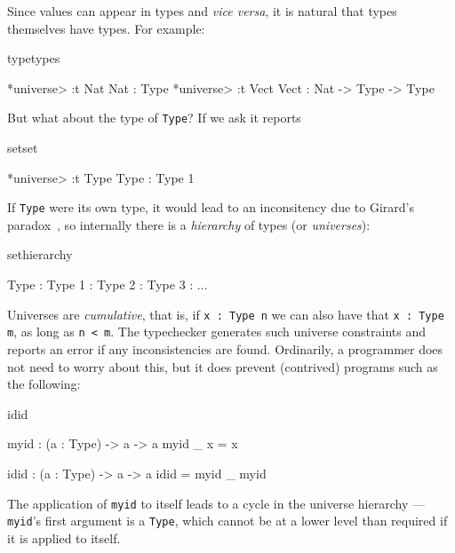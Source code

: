 Since values can appear in types and \emph{vice versa}, it is natural that types themselves
have types. For example:

\begin{SaveVerbatim}{typetypes}

*universe> :t Nat
Nat : Type
*universe> :t Vect
Vect : Nat -> Type -> Type

\end{SaveVerbatim}

\noindent
But what about the type of \texttt{Type}? If we ask \Idris{} it reports

\begin{SaveVerbatim}{setset}

*universe> :t Type
Type : Type 1

\end{SaveVerbatim}

\noindent
If \texttt{Type} were its own type, it would lead to an inconsitency
due to Girard's paradox~\cite{girard-thesis}, so internally there is a \emph{hierarchy}
of types (or \emph{universes}):

\begin{SaveVerbatim}{sethierarchy}

Type : Type 1 : Type 2 : Type 3 : ...

\end{SaveVerbatim}

\noindent
Universes are \emph{cumulative}, that is, if \texttt{x : Type n} we can also have that
\texttt{x : Type m}, as long as \texttt{n < m}. 
The typechecker generates such universe 
constraints and reports an error if any inconsistencies are found. Ordinarily, a
programmer does not need to worry about this, but it does prevent (contrived)
programs such as the following:

\begin{SaveVerbatim}{idid}

myid : (a : Type) -> a -> a
myid _ x = x

idid :  (a : Type) -> a -> a
idid = myid _ myid

\end{SaveVerbatim}

\noindent
The application of \texttt{myid} to itself leads to a cycle in the universe hierarchy
--- \texttt{myid}'s first argument is a \texttt{Type}, which cannot be at a lower level
than required if it is applied to itself.


